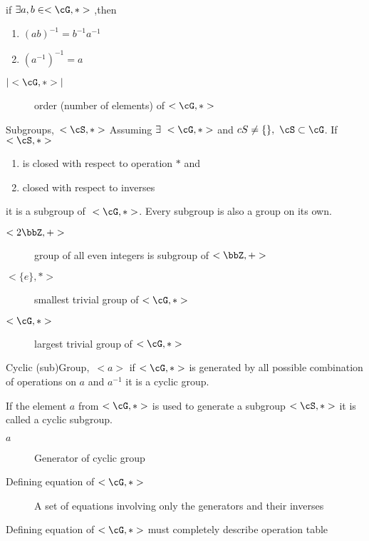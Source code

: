 \documentclass[11pt, oneside, dvipdfmx]{book}
\begin{document}
\paragraph{}

\begin{MyTheorem}
	if $\exists a,b \in < \cG, * >$
	,then
	\begin{enumerate}
		\item $(ab)^{-1} = b^{-1}a^{-1}$
		\item $(a^{-1})^{-1} =a$
	\end{enumerate}
\end{MyTheorem}
\begin{description}
	\item[$|<\cG,*>|$] order (number of elements) of $<\cG,*>$
\end{description}

\begin{MyDefinition}{Subgroups,~$< \cS, * >$}
	Assuming  $\exists ~<\cG, *>$ and $cS \neq \{\},~\cS \subset \cG$. If $< \cS, * >$ 
	\begin{enumerate}
		\item is closed with respect 
		to operation $*$ and
		\item closed with respect to inverses 
	\end{enumerate}
	it is a subgroup of $~<\cG, *>$. Every subgroup is also a group on its own.
\end{MyDefinition}

\begin{description}
	\item[$<2\bbZ, +>$] group of all even integers is subgroup of $<\bbZ, +>$
	\item[$<\{e\}, *>$] smallest trivial group of $<\cG, *>$
	\item[$<\cG, *>$] largest trivial group of $<\cG, *>$
\end{description}

\begin{MyDefinition}{Cyclic (sub)Group,~$<a>$}
	if $<\cG, *>$ is generated by all possible combination of operations on $a$ and $a^{-1}$ it is a cyclic group. 
	
	If the element $a$ from $<\cG, *>$ is used to generate a subgroup $<\cS, *>$ it is called a cyclic subgroup.
\end{MyDefinition}

\begin{description}
	\item[$a$] Generator of cyclic group
	\item[Defining equation of $<\cG, *>$ ]  A set of equations involving only the generators and their inverses
\end{description}
Defining equation of $<\cG, *>$ must completely describe operation table
\end{document}
